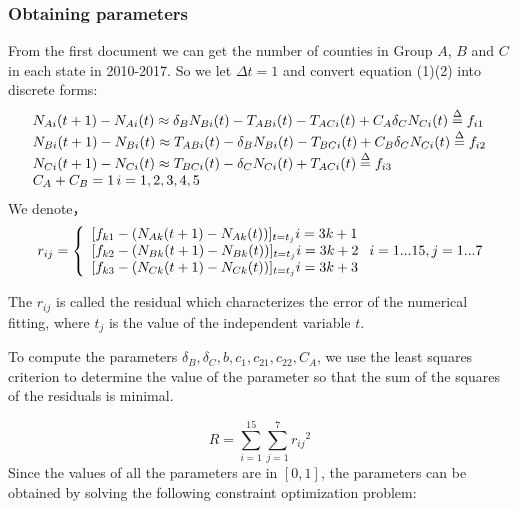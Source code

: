 \documentclass{mcmthesis}
\begin{document}
\subsubsection{Obtaining parameters} \label{Obtaining parameters}
From the first document we can get the number of counties in Group $A$, $B$ and $C$ in each state in 2010-2017. So we let   $\Delta t = 1$ and convert equation (1)(2) into discrete forms:
 \begin{equation}\begin{array}{l}
{N_{Ai}}(t + 1) - {N_{Ai}}(t) \approx {\delta _B}{N_{Bi}}(t) - {T_{ABi}}(t) - {T_{ACi}}(t) + {C_A}{\delta _C}{N_{Ci}}(t) \buildrel \Delta \over = {f_{i1}}\\
{N_{Bi}}(t + 1) - {N_{Bi}}(t) \approx {T_{ABi}}(t) - {\delta _B}{N_{Bi}}(t) - {T_{BCi}}(t) + {C_B}{\delta _C}{N_{Ci}}(t) \buildrel \Delta \over = {f_{i2}}\\
{N_{Ci}}(t + 1) - {N_{Ci}}(t) \approx {T_{BCi}}(t) - {\delta _C}{N_{Ci}}(t) + {T_{ACi}}(t) \buildrel \Delta \over = {f_{i3}}\\
{C_A} + {C_B} = 1{\rm{                                                             }}\,i = 1,2,3,4,5
\end{array} \end{equation}
We denote，
 \begin{equation}{r_{ij}} = \left\{ \begin{array}{l}
{[{f_{k1}} - ({N_{Ak}}(t + 1) - {N_{Ak}}(t))]_{t = {t_j}}}{\rm{            }}i = 3k + 1\\
{[{f_{k2}} - ({N_{Bk}}(t + 1) - {N_{Bk}}(t))]_{t = {t_j}}}{\rm{            }}i = 3k + 2\\
{[{f_{k3}} - ({N_{Ck}}(t + 1) - {N_{Ck}}(t))]_{t = {t_j}}}{\rm{            }}i = 3k + 3
\end{array} \right.{\rm{     }}i = 1...15,j = 1...7 \end{equation}

The ${r_{ij}}$ is called the residual which characterizes the error of the numerical fitting,  where ${t_j}$ is the value of the independent variable $t$.

To compute the parameters ${\delta _B},{\delta _C},b,{c_1},{c_{21}},{c_{22}},{C_A}$,  we use the least squares criterion to determine the value of the parameter so that the sum of the squares of the residuals is minimal.
 
 \begin{equation}R = \sum\limits_{i = 1}^{15} {\sum\limits_{j = 1}^7 {{r_{ij}}^2} }   \end{equation}
Since the values of all the parameters are in $[0,1]$, the parameters can be obtained by solving the following constraint optimization problem:
 
\end{document}
